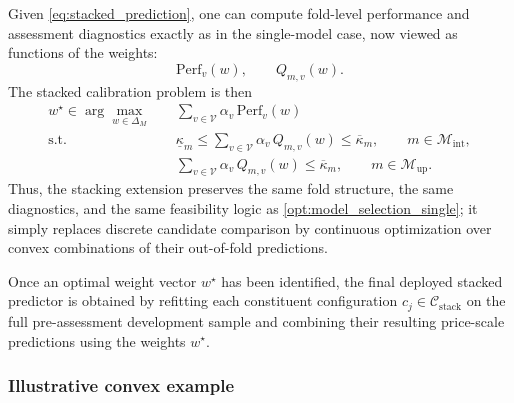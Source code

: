 \documentclass[12pt, draft]{article}
\theoremstyle{plain}
\theoremstyle{definition}
\newcommand{\1}{\mathbf{1}}
\begin{document}
Given \eqref{eq:stacked_prediction}, one can compute fold-level performance and assessment diagnostics exactly as in the single-model case, now viewed as functions of the weights:
\[
\mathrm{Perf}_v(w),
\qquad
Q_{m,v}(w).
\]
The stacked calibration problem is then
\begin{align}
    \label{opt:model_selection_stacking}
    w^\star
    \in
    \arg\max_{w\in\Delta_M}
    \quad
    & \sum_{v\in\mathcal V}\alpha_v\,\mathrm{Perf}_v(w)
    \\
    \text{s.t.}\quad
    & \underline{\kappa}_m
      \le
      \sum_{v\in\mathcal V}\alpha_v\,Q_{m,v}(w)
      \le
      \overline{\kappa}_m,
      \qquad
      m\in\mathcal M_{\mathrm{int}},
      \nonumber\\
    & \sum_{v\in\mathcal V}\alpha_v\,Q_{m,v}(w)
      \le
      \overline{\kappa}_m,
      \qquad
      m\in\mathcal M_{\mathrm{up}}.
      \nonumber
\end{align}
Thus, the stacking extension preserves the same fold structure, the same diagnostics, and the same feasibility logic as \eqref{opt:model_selection_single}; it simply replaces discrete candidate comparison by continuous optimization over convex combinations of their out-of-fold predictions.

Once an optimal weight vector $w^\star$ has been identified, the final deployed stacked predictor is obtained by refitting each constituent configuration $c_j\in\mathcal C_{\mathrm{stack}}$ on the full pre-assessment development sample and combining their resulting price-scale predictions using the weights $w^\star$.

\subsubsection{Illustrative convex example}
\label{subsubsec:convex_example}
\end{document}
